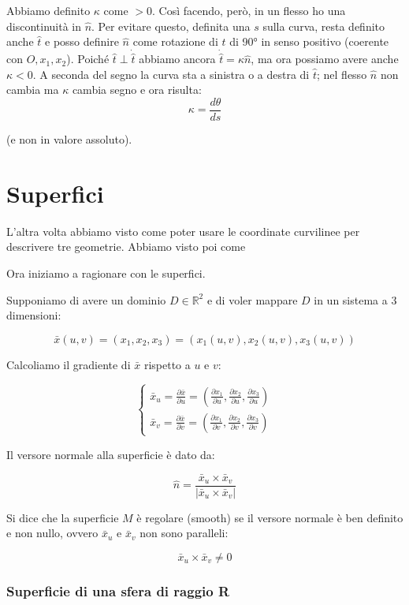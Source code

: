 Abbiamo definito $\kappa$ come $> 0$. Così facendo, però, in un flesso ho una discontinuità in $\hat n$. Per evitare questo, definita una $s$ sulla curva, resta definito anche $\hat t$ e posso definire $\hat n$ come rotazione di $\hat t$ di 90° in senso positivo (coerente con $O, x_1, x_2$). Poiché $\hat t \perp \dot{\hat t}$ abbiamo ancora $\dot{\hat t} = \kappa\hat n$, ma ora possiamo avere anche $\kappa < 0$. A seconda del segno la curva sta a sinistra o a destra di $\hat t$; nel flesso $\hat n$ non cambia ma $\kappa$ cambia segno e ora risulta:
$$
\kappa = \dfrac {d\theta}{ds}
$$

(e non in valore assoluto).

\section{Superfici}

L'altra volta abbiamo visto come poter usare le coordinate curvilinee per descrivere tre geometrie.
Abbiamo visto poi come 

Ora iniziamo a ragionare con le superfici.

Supponiamo di avere un dominio $D \in \mathbb{R}^2$ e di voler mappare $D$ in un sistema a 3 dimensioni:

$$
\bar{x}(u,v) = (x_1, x_2, x_3) = (x_1(u,v), x_2(u,v), x_3(u,v))
$$

Calcoliamo il gradiente di $\bar{x}$ rispetto a $u$ e $v$:

$$
\begin{cases}
\bar x_u = \frac{\partial \bar x}{\partial u} = \left( \frac{\partial x_1}{\partial u}, \frac{\partial x_2}{\partial u}, \frac{\partial x_3}{\partial u} \right)
\\
\bar x_v =\frac{\partial \bar x}{\partial v} = \left( \frac{\partial x_1}{\partial v}, \frac{\partial x_2}{\partial v}, \frac{\partial x_3}{\partial v} \right)
\end{cases}
$$

Il versore normale alla superficie è dato da:

$$
\hat {n} = \dfrac{\bar x_u \times \bar x_v}{|\bar x_u \times \bar x_v|}
$$

Si dice che la superficie $M$ è regolare (smooth) se il versore normale è ben definito e non nullo, ovvero $\bar x_u$ e $\bar x_v$ non sono paralleli:

$$
\bar x_u \times \bar x_v \neq 0
$$

\subsubsection{Superficie di una sfera di raggio R}

